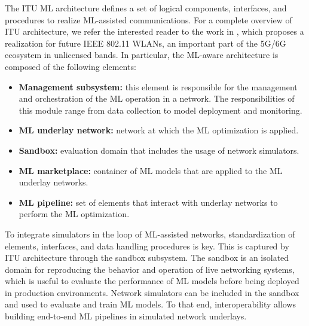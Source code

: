 \documentclass{article}
\begin{document}
    The ITU ML architecture defines a set of logical components, interfaces, and procedures to realize ML-assisted communications. For a complete overview of ITU architecture, we refer the interested reader to the work in \cite{itu_architecture}, which proposes a realization for future IEEE 802.11 WLANs, an important part of the 5G/6G ecosystem in unlicensed bands. In particular, the ML-aware architecture is composed of the following elements:
	\begin{itemize}
		\item \textbf{Management subsystem:} this element is responsible for the management and orchestration of the ML operation in a network. The responsibilities of this module range from data collection to model deployment and monitoring.
		\item \textbf{ML underlay network:} network at which the ML optimization is applied.
		\item \textbf{Sandbox:} evaluation domain that includes the usage of network simulators.
		\item \textbf{ML marketplace:} container of ML models that are applied to the ML underlay networks.
		\item \textbf{ML pipeline:} set of elements that interact with underlay networks to perform the ML optimization. 
	\end{itemize} 
	
	To integrate simulators in the loop of ML-assisted networks, standardization of elements, interfaces, and data handling procedures is key. This is captured by ITU architecture through the sandbox subsystem. The sandbox is an isolated domain for reproducing the behavior and operation of live networking systems, which is useful to evaluate the performance of ML models before being deployed in production environments. Network simulators can be included in the sandbox and used to evaluate and train ML models. To that end, interoperability allows building end-to-end ML pipelines in simulated network underlays.
	
\end{document}
